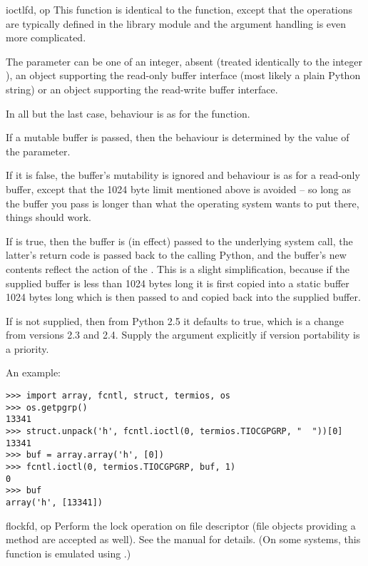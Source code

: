 \begin{funcdesc}{ioctl}{fd, op}
  This function is identical to the  function,
  except that the operations are typically defined in the library
  module  and the argument handling is even more
  complicated.
  
  The parameter  can be one of an integer, absent (treated
  identically to the integer ), an object supporting the
  read-only buffer interface (most likely a plain Python string) or an
  object supporting the read-write buffer interface.
  
  In all but the last case, behaviour is as for the 
  function.
  
  If a mutable buffer is passed, then the behaviour is determined by
  the value of the  parameter.
  
  If it is false, the buffer's mutability is ignored and behaviour is
  as for a read-only buffer, except that the 1024 byte limit mentioned
  above is avoided -- so long as the buffer you pass is longer than
  what the operating system wants to put there, things should work.
  
  If  is true, then the buffer is (in effect) passed
  to the underlying  system call, the latter's
  return code is passed back to the calling Python, and the buffer's
  new contents reflect the action of the .  This is a
  slight simplification, because if the supplied buffer is less than
  1024 bytes long it is first copied into a static buffer 1024 bytes
  long which is then passed to  and copied back into
  the supplied buffer.
  
  If  is not supplied, then from Python 2.5 it
  defaults to true, which is a change from versions 2.3 and 2.4.
  Supply the argument explicitly if version portability is a priority.

  An example:

\begin{verbatim}
>>> import array, fcntl, struct, termios, os
>>> os.getpgrp()
13341
>>> struct.unpack('h', fcntl.ioctl(0, termios.TIOCGPGRP, "  "))[0]
13341
>>> buf = array.array('h', [0])
>>> fcntl.ioctl(0, termios.TIOCGPGRP, buf, 1)
0
>>> buf
array('h', [13341])
\end{verbatim}
\end{funcdesc}

\begin{funcdesc}{flock}{fd, op}
Perform the lock operation  on file descriptor  (file
  objects providing a  method are accepted as well).
See the \UNIX{} manual  for details.  (On some
systems, this function is emulated using .)
\end{funcdesc}

